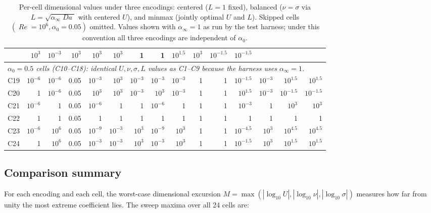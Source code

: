\documentclass[11pt]{article}
\newcommand{\Reyn}{\operatorname{\mathit{Re}}}
\newcommand{\Damk}{\operatorname{\mathit{Da}}}
\begin{document}
\begin{table}[!htbp]
\begin{tabular}{l rrr rrr rrrr rrrr}
        & $10^{3}$ & $10^{-3}$ & $10^{3}$
        & $10^{3}$ & $10^{3}$ & 1 & 1
        & $10^{1.5}$ & $10^{3}$ & $10^{-1.5}$ & $10^{-1.5}$ \\
    \midrule
    \multicolumn{15}{l}{\emph{$\alpha_0 = 0.5$ cells (C10--C18): identical $U, \nu, \sigma, L$ values
                                  as C1--C9 because the harness uses
                                  $\alpha_\infty = 1$.}} \\
    \midrule
    C19 & $10^{-6}$ & $10^{-6}$ & 0.05
        & $10^{-3}$ & $10^{3}$ & $10^{-3}$
        & $10^{-3}$ & $10^{-3}$ & 1 & 1
        & $10^{-1.5}$ & $10^{-3}$ & $10^{1.5}$ & $10^{1.5}$ \\
    C20 & 1 & $10^{-6}$ & 0.05
        & $10^{3}$ & $10^{3}$ & $10^{-3}$
        & $10^{3}$ & $10^{-3}$ & 1 & 1
        & $10^{1.5}$ & $10^{-3}$ & $10^{-1.5}$ & $10^{-1.5}$ \\
    C21 & $10^{-6}$ & 1 & 0.05
        & $10^{-6}$ & 1 & 1
        & $10^{-6}$ & 1 & 1 & 1
        & $10^{-3}$ & 1 & $10^{3}$ & $10^{3}$ \\
    C22 & 1 & 1 & 0.05
        & 1 & 1 & 1
        & 1 & 1 & 1 & 1
        & 1 & 1 & 1 & 1 \\
    C23 & $10^{-6}$ & $10^{6}$ & 0.05
        & $10^{-9}$ & $10^{-3}$ & $10^{3}$
        & $10^{-9}$ & $10^{3}$ & 1 & 1
        & $10^{-4.5}$ & $10^{3}$ & $10^{4.5}$ & $10^{4.5}$ \\
    C24 & 1 & $10^{6}$ & 0.05
        & $10^{-3}$ & $10^{-3}$ & $10^{3}$
        & $10^{-3}$ & $10^{3}$ & 1 & 1
        & $10^{-1.5}$ & $10^{3}$ & $10^{1.5}$ & $10^{1.5}$ \\
    \bottomrule
  \end{tabular}
  \caption{Per-cell dimensional values under three encodings: centered
    ($L=1$ fixed), balanced ($\nu = \sigma$ via $L = \sqrt{\alpha_\infty \Damk}$
    with centered $U$), and minmax (jointly optimal $U$ and $L$).
    Skipped cells $(\Reyn=10^{6}, \alpha_0=0.05)$ omitted. Values shown
    with $\alpha_\infty = 1$ as run by the test harness; under this
    convention all three encodings are independent of $\alpha_0$.}
  \label{tab:per-cell-varL}
\end{table}

\subsection{Comparison summary}
\label{sec:varL-comparison}

For each encoding and each cell, the worst-case dimensional excursion
$M = \max(|\log_{10} U|, |\log_{10}\nu|, |\log_{10}\sigma|)$ measures
how far from unity the most extreme coefficient lies. The sweep maxima
over all 24 cells are:
\end{document}
